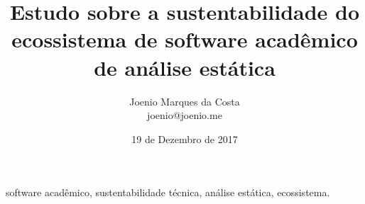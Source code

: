 \documentclass[msc, classic, a4paper]{ufbathesis}
\date{19 de Dezembro de 2017}
\title{
  Estudo sobre a sustentabilidade do ecossistema de software acadêmico de
  análise estática
}
\author{Joenio Marques da Costa\\
  {\small joenio@joenio.me}
}
\begin{document}
\frontpage
\frontmatter
\presentationpage

\resumo



\begin{keywords}

software acadêmico, sustentabilidade técnica, análise estática, ecossistema.

\end{keywords}

\tableofcontents
\listoffigures
\listoftables

\mainmatter











%











\backmatter


\appendix


\end{document}
